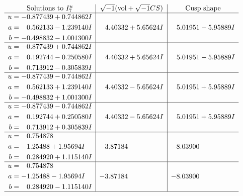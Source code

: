 \documentclass[1p]{elsarticle_modified}
\theoremstyle{definition}
\newcommand{\I}{\sqrt{-1}}
\begin{document}
$$\begin{array}{c|c|c}  
\text{Solutions to }I^u_{7}& \I (\text{vol} + \sqrt{-1}CS) & \text{Cusp shape}\\
 \hline 
\begin{aligned}
u &= -0.877439 + 0.744862 I \\
a &= \phantom{-}0.562133 - 1.239140 I \\
b &= -0.498832 - 1.001300 I\end{aligned}
 & \phantom{-}4.40332 + 5.65624 I & \phantom{-}5.01951 - 5.95889 I \\ \hline\begin{aligned}
u &= -0.877439 + 0.744862 I \\
a &= \phantom{-}0.192744 - 0.250580 I \\
b &= \phantom{-}0.713912 - 0.305839 I\end{aligned}
 & \phantom{-}4.40332 + 5.65624 I & \phantom{-}5.01951 - 5.95889 I \\ \hline\begin{aligned}
u &= -0.877439 - 0.744862 I \\
a &= \phantom{-}0.562133 + 1.239140 I \\
b &= -0.498832 + 1.001300 I\end{aligned}
 & \phantom{-}4.40332 - 5.65624 I & \phantom{-}5.01951 + 5.95889 I \\ \hline\begin{aligned}
u &= -0.877439 - 0.744862 I \\
a &= \phantom{-}0.192744 + 0.250580 I \\
b &= \phantom{-}0.713912 + 0.305839 I\end{aligned}
 & \phantom{-}4.40332 - 5.65624 I & \phantom{-}5.01951 + 5.95889 I \\ \hline\begin{aligned}
u &= \phantom{-}0.754878\phantom{ +0.000000I} \\
a &= -1.25488 + 1.95694 I \\
b &= \phantom{-}0.284920 + 1.115140 I\end{aligned}
 & -3.87184\phantom{ +0.000000I} & -8.03900\phantom{ +0.000000I} \\ \hline\begin{aligned}
u &= \phantom{-}0.754878\phantom{ +0.000000I} \\
a &= -1.25488 - 1.95694 I \\
b &= \phantom{-}0.284920 - 1.115140 I\end{aligned}
 & -3.87184\phantom{ +0.000000I} & -8.03900\phantom{ +0.000000I}\\
 \hline 
 \end{array}$$\newpage\newpage\renewcommand{\arraystretch}{1}
\end{document}
